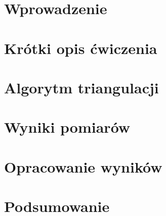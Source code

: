 \documentclass{sprawozdanie-agh}
\begin{document}

\stronatytulowa{}

\section{Wprowadzenie}


\section{Krótki opis ćwiczenia}

\section{Algorytm triangulacji}



\section{Wyniki pomiarów}


\section{Opracowanie wyników}
\section{Podsumowanie}

\end{document}
